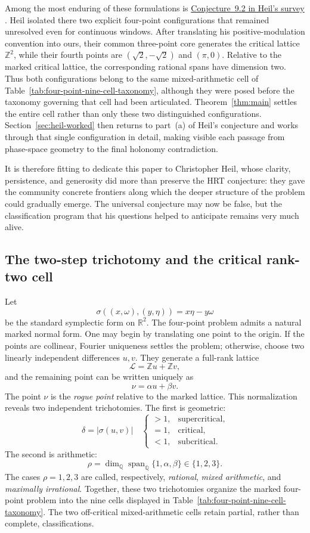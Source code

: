 \documentclass[reqno]{amsart}
\theoremstyle{remark}
\numberwithin{equation}{section}
\newcommand{\R}{\mathbb{R}}
\newcommand{\Q}{\mathbb{Q}}
\newcommand{\Z}{\mathbb{Z}}
\begin{document}
Among the most enduring of these formulations is
\href{https://heil.math.gatech.edu/papers/hrtnotes.pdf\#page=3}
{Conjecture~9.2 in Heil's survey}
\cite[Conjecture~9.2, p.~173]{HeilSurvey}. Heil isolated there two explicit
four-point configurations that remained unresolved even for continuous
windows. After translating his positive-modulation convention into ours,
their common three-point core generates the critical lattice \(\Z^2\), while
their fourth points are \((\sqrt2,-\sqrt2)\) and \((\pi,0)\). Relative to the
marked critical lattice, the corresponding rational spans have dimension two.
Thus both configurations belong to the same mixed-arithmetic cell of
Table~\ref{tab:four-point-nine-cell-taxonomy}, although they were posed before
the taxonomy governing that cell had been articulated. Theorem~\ref{thm:main}
settles the entire cell rather than only these two distinguished
configurations. Section~\ref{sec:heil-worked} then returns to part~(a) of
Heil's conjecture and works through that single configuration in detail,
making visible each passage from phase-space geometry to the final holonomy
contradiction.

It is therefore fitting to dedicate this paper to Christopher Heil, whose
clarity, persistence, and generosity did more than preserve the HRT
conjecture: they gave the community concrete frontiers along which the deeper
structure of the problem could gradually emerge. The universal conjecture
may now be false, but the classification program that his questions helped
to anticipate remains very much alive.

\subsection{The two-step trichotomy and the critical rank-two cell}

Let
\[
  \sigma((x,\omega),(y,\eta))=x\eta-y\omega
\]
be the standard symplectic form on \(\R^2\). The four-point problem admits a
natural marked normal form. One may begin by translating one point to the origin. If the points
are collinear, Fourier uniqueness settles the problem; otherwise, choose two
linearly independent differences \(u,v\). They generate a full-rank lattice
\[
  \mathcal L=\Z u+\Z v,
\]
and the remaining point can be written uniquely as
\[
  \nu=\alpha u+\beta v.
\]
The point \(\nu\) is the \emph{rogue point} relative to the marked lattice. This normalization reveals two independent trichotomies. The first is
geometric:
\[
  \delta=|\sigma(u,v)|
  \quad
  \begin{cases}
    >1,&\text{supercritical},\\
    =1,&\text{critical},\\
    <1,&\text{subcritical}.
  \end{cases}
\]
The second is arithmetic:
\[
  \rho
  =\dim_{\Q}\operatorname{span}_{\Q}\{1,\alpha,\beta\}
  \in\{1,2,3\}.
\]
The cases \(\rho=1,2,3\) are called, respectively, \emph{rational},
\emph{mixed arithmetic}, and \emph{maximally irrational}. Together, these
two trichotomies organize the marked four-point problem into the nine cells
displayed in Table~\ref{tab:four-point-nine-cell-taxonomy}. The two
off-critical mixed-arithmetic cells retain partial, rather than complete,
classifications.
\end{document}
